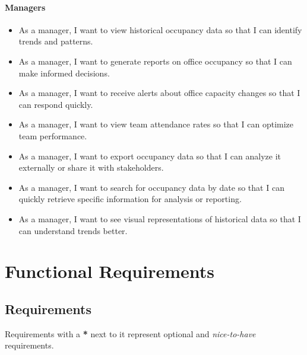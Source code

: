 \documentclass[11pt,a4paper]{article}
\begin{document}
\paragraph{Managers}
\begin{itemize}
    \item As a manager, I want to view historical occupancy data so that I can identify trends and patterns.
    \item As a manager, I want to generate reports on office occupancy so that I can make informed decisions.
    \item As a manager, I want to receive alerts about office capacity changes so that I can respond quickly.
    \item As a manager, I want to view team attendance rates so that I can optimize team performance.
    \item As a manager, I want to export occupancy data so that I can analyze it externally or share it with stakeholders.
    \item As a manager, I want to search for occupancy data by date so that I can quickly retrieve specific information for analysis or reporting.
    \item As a manager, I want to see visual representations of historical data so that I can understand trends better.
\end{itemize}

\pagebreak

\section*{Functional Requirements}

\subsection*{Requirements}
Requirements with a \textbf{*} next to it represent optional and \textit{nice-to-have} requirements.
\end{document}
